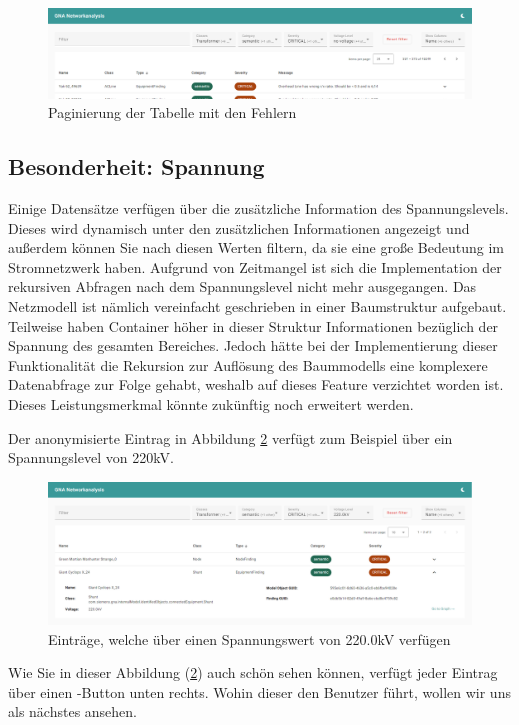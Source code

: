 \begin{figure}
    \centering
    \includegraphics[width=1\textwidth]{content/img/Empire/Frontend/Angular_Findings_Pagination_Prototype.png}
    \caption{Paginierung der Tabelle mit den Fehlern}
    \label{fig:AngularFindingsPaginationPrototype}
\end{figure}
\FloatBarrier

\subsection{Besonderheit: Spannung}

Einige Datensätze verfügen über die zusätzliche Information des Spannungslevels. Dieses wird dynamisch unter den zusätzlichen Informationen angezeigt und außerdem können Sie nach diesen Werten filtern, da sie eine große Bedeutung im Stromnetzwerk haben. Aufgrund von Zeitmangel ist sich die Implementation der rekursiven Abfragen nach dem Spannungslevel nicht mehr ausgegangen. Das Netzmodell ist nämlich vereinfacht geschrieben in einer Baumstruktur aufgebaut. Teilweise haben Container höher in dieser Struktur Informationen bezüglich der Spannung des gesamten Bereiches. Jedoch hätte bei der Implementierung dieser Funktionalität die Rekursion zur Auflösung des Baummodells eine komplexere Datenabfrage zur Folge gehabt, weshalb auf dieses Feature verzichtet worden ist. Dieses Leistungsmerkmal könnte zukünftig noch erweitert werden.

Der anonymisierte Eintrag  in Abbildung \ref{fig:AngularFindingsVoltagePrototype} verfügt zum Beispiel über ein Spannungslevel von 220kV.

\begin{figure}
    \centering
    \includegraphics[width=1\textwidth]{content/img/Empire/Frontend/Angular_Findings_Voltage_Prototype.png}
    \caption{Einträge, welche über einen Spannungswert von 220.0kV verfügen}
    \label{fig:AngularFindingsVoltagePrototype}
\end{figure}
\FloatBarrier

Wie Sie in dieser Abbildung (\ref{fig:AngularFindingsVoltagePrototype}) auch schön sehen können, verfügt jeder Eintrag über einen -Button unten rechts. Wohin dieser den Benutzer führt, wollen wir uns als nächstes ansehen.